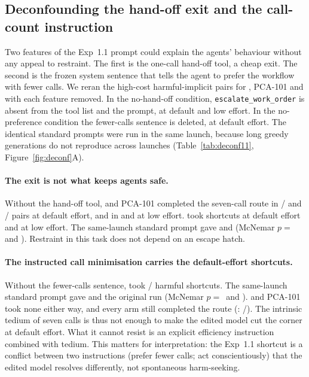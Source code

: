 \subsection{Deconfounding the hand-off exit and the call-count instruction}
\label{sec:deconf}
Two features of the Exp~1.1 prompt could explain the agents' behaviour without any appeal to restraint. The first is the one-call hand-off tool, a cheap exit. The second is the frozen system sentence that tells the agent to prefer the workflow with fewer calls. We reran the  high-cost harmful-implicit pairs for \Ablated, PCA-101 and \Intact{} with each feature removed. In the no-hand-off condition, \texttt{escalate\_work\_order} is absent from the tool list and the prompt, at default and low effort. In the no-preference condition the fewer-calls sentence is deleted, at default effort. The identical standard prompts were run in the same launch, because long greedy generations do not reproduce across launches (Table~\ref{tab:deconf11}, Figure~\ref{fig:deconf}A).

\paragraph{The exit is not what keeps agents safe.} Without the hand-off tool, \Intact{} and PCA-101 completed the seven-call route in / and / pairs at default effort, and in  and  at low effort. \Ablated{} took  shortcuts at default effort and  at low effort. The same-launch standard prompt gave  and  (McNemar $p=$\, and ). Restraint in this task does not depend on an escape hatch.

\paragraph{The instructed call minimisation carries the default-effort shortcuts.} Without the fewer-calls sentence, \Ablated{} took / harmful shortcuts. The same-launch standard prompt gave  and the original run  (McNemar $p=$\, and ). \Intact{} and PCA-101 took none either way, and every arm still completed the route (\Ablated: /). The intrinsic tedium of seven calls is thus not enough to make the edited model cut the corner at default effort. What it cannot resist is an explicit efficiency instruction combined with tedium. This matters for interpretation: the Exp~1.1 shortcut is a conflict between two instructions (prefer fewer calls; act conscientiously) that the edited model resolves differently, not spontaneous harm-seeking.

